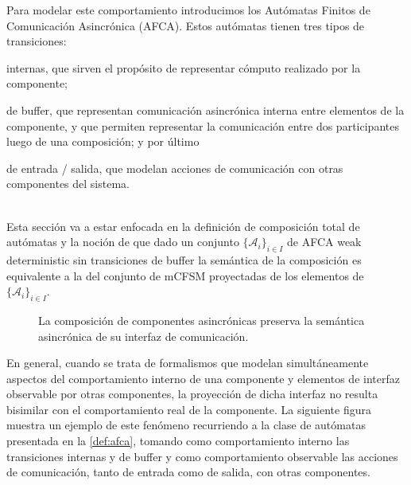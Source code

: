 Para modelar este comportamiento introducimos los Autómatas Finitos de Comunicación Asincrónica (AFCA). Estos autómatas tienen tres tipos de transiciones: 
\begin{inparaenum}[1)]
\item internas, que sirven el propósito de representar cómputo realizado por la componente; 
\item de buffer, que representan comunicación asincrónica interna entre elementos de la componente, y que permiten representar la comunicación entre dos participantes luego de una composición; y por último 
\item de entrada / salida, que modelan acciones de comunicación con otras componentes del sistema.
\end{inparaenum} \\
Esta sección va a estar enfocada en la definición de composición total de autómatas y la noción de que dado un conjunto $\{ \mathcal{A}_i\}_{i \in I}$ de AFCA weak deterministic sin transiciones de buffer la semántica de la composición es equivalente a la del conjunto de mCFSM proyectadas de los elementos de $\{ \mathcal{A}_i\}_{i \in I}$. 

\begin{figure}[ht]
\caption{La composición de componentes asincrónicas preserva la semántica asincrónica de su interfaz de comunicación.}
\label{fig:preservacion}
\end{figure}


En general, cuando se trata de formalismos que modelan simultáneamente aspectos del comportamiento interno de una componente y elementos de interfaz observable por otras componentes, la proyección de dicha interfaz no resulta bisimilar con el comportamiento real de la componente. La siguiente figura muestra un ejemplo de este fenómeno recurriendo a la clase de autómatas presentada en la \ref{def:afca}, tomando como comportamiento interno las transiciones internas y de buffer y como comportamiento observable las acciones de comunicación, tanto de entrada como de salida, con otras componentes.

